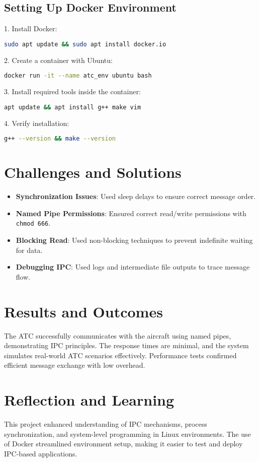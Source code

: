 \documentclass[conference]{IEEEtran}
\begin{document}
\subsection{Setting Up Docker Environment}
1. Install Docker:
\begin{lstlisting}[language=bash]
sudo apt update && sudo apt install docker.io
\end{lstlisting}

2. Create a container with Ubuntu:
\begin{lstlisting}[language=bash]
docker run -it --name atc_env ubuntu bash
\end{lstlisting}

3. Install required tools inside the container:
\begin{lstlisting}[language=bash]
apt update && apt install g++ make vim
\end{lstlisting}

4. Verify installation:
\begin{lstlisting}[language=bash]
g++ --version && make --version
\end{lstlisting}

\section{Challenges and Solutions}
\begin{itemize}
    \item \textbf{Synchronization Issues}: Used sleep delays to ensure correct message order.
    \item \textbf{Named Pipe Permissions}: Ensured correct read/write permissions with \texttt{chmod 666}.
    \item \textbf{Blocking Read}: Used non-blocking techniques to prevent indefinite waiting for data.
    \item \textbf{Debugging IPC}: Used logs and intermediate file outputs to trace message flow.
\end{itemize}

\section{Results and Outcomes}
The ATC successfully communicates with the aircraft using named pipes, demonstrating IPC principles. The response times are minimal, and the system simulates real-world ATC scenarios effectively. Performance tests confirmed efficient message exchange with low overhead.

\section{Reflection and Learning}
This project enhanced understanding of IPC mechanisms, process synchronization, and system-level programming in Linux environments. The use of Docker streamlined environment setup, making it easier to test and deploy IPC-based applications.
\end{document}

